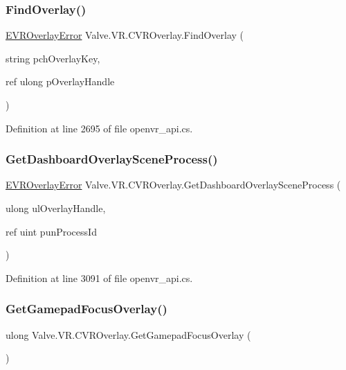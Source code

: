 \subsubsection{\texorpdfstring{FindOverlay()}{FindOverlay()}}
{\footnotesize\ttfamily \mbox{\hyperlink{namespace_valve_1_1_v_r_aaee5c5144f42b7969d45b854f51b0c18}{E\+V\+R\+Overlay\+Error}} Valve.\+V\+R.\+C\+V\+R\+Overlay.\+Find\+Overlay (\begin{DoxyParamCaption}\item[{string}]{pch\+Overlay\+Key,  }\item[{ref ulong}]{p\+Overlay\+Handle }\end{DoxyParamCaption})}



Definition at line 2695 of file openvr\+\_\+api.\+cs.

\mbox{\label{class_valve_1_1_v_r_1_1_c_v_r_overlay_a1741a80ecf6cd56ce4374955e81791e4}} 
\subsubsection{\texorpdfstring{GetDashboardOverlaySceneProcess()}{GetDashboardOverlaySceneProcess()}}
{\footnotesize\ttfamily \mbox{\hyperlink{namespace_valve_1_1_v_r_aaee5c5144f42b7969d45b854f51b0c18}{E\+V\+R\+Overlay\+Error}} Valve.\+V\+R.\+C\+V\+R\+Overlay.\+Get\+Dashboard\+Overlay\+Scene\+Process (\begin{DoxyParamCaption}\item[{ulong}]{ul\+Overlay\+Handle,  }\item[{ref uint}]{pun\+Process\+Id }\end{DoxyParamCaption})}



Definition at line 3091 of file openvr\+\_\+api.\+cs.

\mbox{\label{class_valve_1_1_v_r_1_1_c_v_r_overlay_ae6ebda8ff88a57e655434e25e6e35e35}} 
\subsubsection{\texorpdfstring{GetGamepadFocusOverlay()}{GetGamepadFocusOverlay()}}
{\footnotesize\ttfamily ulong Valve.\+V\+R.\+C\+V\+R\+Overlay.\+Get\+Gamepad\+Focus\+Overlay (\begin{DoxyParamCaption}{ }\end{DoxyParamCaption})}



